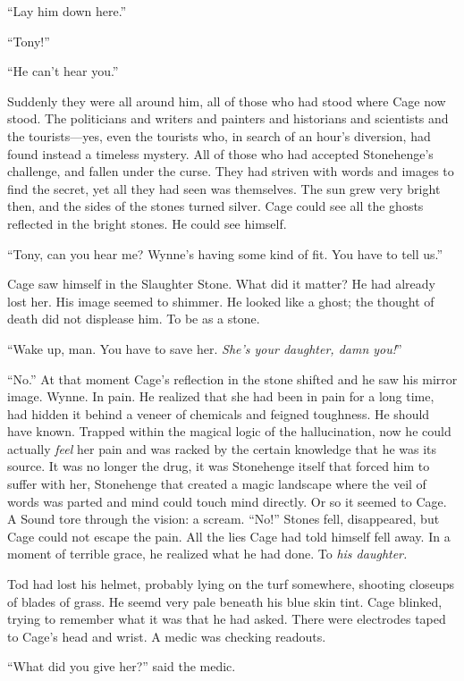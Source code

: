 ``Lay him down here.''

``Tony!''

``He can't hear you.''

Suddenly they were all around him, all of those who had stood where Cage now stood. The politicians and writers and painters and historians and scientists and the tourists---yes, even the tourists who, in search of an hour's diversion, had found instead a timeless mystery. All of those who had accepted Stonehenge's challenge, and fallen under the curse. They had striven with words and images to find the secret, yet all they had seen was themselves. The sun grew very bright then, and the sides of the stones turned silver. Cage could see all the ghosts reflected in the bright stones. He could see himself.

``Tony, can you hear me? Wynne's having some kind of fit. You have to tell us.''

Cage saw himself in the Slaughter Stone. What did it matter? He had already lost her. His image seemed to shimmer. He looked like a ghost; the thought of death did not displease him. To be as a stone.

``Wake up, man. You have to save her. \textit{She's your daughter, damn you!}''

``No.'' At that moment Cage's reflection in the stone shifted and he saw his mirror image. Wynne. In pain. He realized that she had been in pain for a long time, had hidden it behind a veneer of chemicals and feigned toughness. He should have known. Trapped within the magical logic of the hallucination, now he could actually \textit{feel} her pain and was racked by the certain knowledge that he was its source. It was no longer the drug, it was Stonehenge itself that forced him to suffer with her, Stonehenge that created a magic landscape where the veil of words was parted and mind could touch mind directly. Or so it seemed to Cage. A Sound tore through the vision: a scream. ``No!'' Stones fell, disappeared, but Cage could not escape the pain. All the lies Cage had told himself fell away. In a moment of terrible grace, he realized what he had done. To \textit{his daughter.}

Tod had lost his helmet, probably lying on the turf somewhere, shooting closeups of blades of grass. He seemd very pale beneath his blue skin tint. Cage blinked, trying to remember what it was that he had asked. There were electrodes taped to Cage's head and wrist. A medic was checking readouts.

``What did you give her?'' said the medic.

